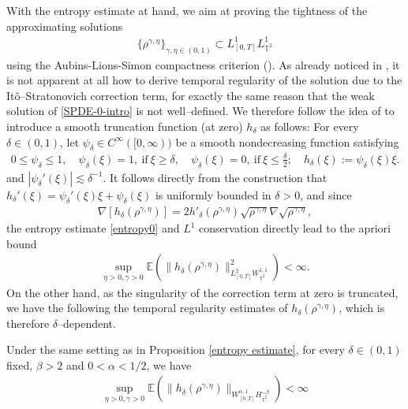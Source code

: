 With the entropy estimate at hand, we aim at proving the tightness of the approximating solutions 
\begin{align*}
\{\rho^{\gamma, \eta}\}_{\gamma,\eta\in(0,1)} \subset L^1_{[0, T]} L^1_{\mathbb{T}^2}
\end{align*}
using the Aubins-Lions-Simon compactness criterion (\cite[Corollary 5]{Sim87}). As already noticed in \cite{FG24}, it is not apparent at all how to derive temporal regularity of the solution due to the It\^o--Stratonovich correction term, for exactly the same reason that the weak solution of \eqref{SPDE-0-intro} is not well--defined. We therefore follow the idea of \cite{FG24} to introduce a smooth truncation function (at zero) $h_\delta$ as follows: For every $\delta\in(0,1)$, let $\psi_{\delta}\in C^{\infty}([0,\infty))$ be a smooth nondecreasing function satisfying 
\begin{align}
0 \leq \psi_{\delta} \leq 1, \quad \psi_{\delta}(\xi)=1, \ \text{if} \ \xi\ge\delta, \quad \psi_{\delta}(\xi)=0, \ \text{if} \ \xi\le \frac{\delta}{2}; \quad h_{\delta}(\xi) := \psi_{\delta}(\xi) \xi.
\end{align} 
and $\left|\psi_{\delta}'(\xi)\right|\lesssim \delta^{-1}$. It follows directly from the construction that $h_{\delta}'(\xi)=\psi_{\delta}'(\xi)\xi+\psi_{\delta}(\xi)$ is uniformly bounded in $\delta > 0$, and since 
\begin{align*}
\nabla \left[h_{\delta}(\rho^{\gamma, \eta})\right] = 2h'_{\delta}(\rho^{\gamma, \eta}) \sqrt{\rho^{\gamma, \eta}} \nabla \sqrt{\rho^{\gamma, \eta}},
\end{align*}
the entropy estimate \eqref{entropy0} and $L^1$ conservation directly lead to the apriori bound
\begin{align}\label{eq:entropy-truncated}
\sup_{\eta > 0, \gamma > 0}\mathbb{E}\left(\|h_{\delta}(\rho^{\gamma, \eta})\|^2_{L^{2}_{[0,T]}W^{1,1}_{\mathbb{T}^2}}\right) < \infty.
\end{align}
On the other hand, as the singularity of the correction term at zero is truncated, we have the following the temporal regularity estimates of $h_{\delta}(\rho^{\gamma, \eta})$, which is therefore $\delta$--dependent. 
\begin{lem}\label{spde E T2}Under the same setting as in Proposition \ref{entropy estimate}, for every $\delta\in(0,1)$ fixed, $\beta > 2$ and $0 < \alpha <1/2$, we have
\begin{align}	
\sup_{\eta >0, \gamma > 0}\mathbb{E}\left(\|h_{\delta}(\rho^{\gamma, \eta})\|_{W^{\alpha,1}_{[0,T]}H^{-\beta}_{\mathbb{T}^2}}\right) < \infty
\end{align}
\end{lem}
